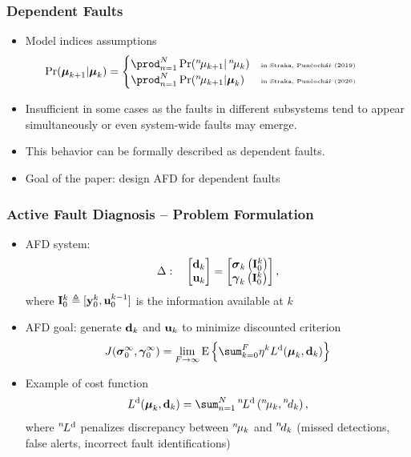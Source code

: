 \documentclass[usenames,dvipsnames]{beamer}
\def\nth{\prescript{n\!}{}}
\begin{document}
\begin{frame}
  \frametitle{Dependent Faults}
  \begin{itemize}
    \item Model indices assumptions
      \begin{align*}
      \hspace*{-3em}
        \Pr(\bfmu_{k+1}|\bfmu_{k})=
        \begin{cases}
        \prod_{n=1}^N\Pr(\nth{\mu}_{k+1}|\nth{\mu}_{k}) & \text{\tiny in~Straka, Pun\v{c}och\'{a}\v{r} (2019)}\\
          \prod_{n=1}^N\Pr(\nth{\mu}_{k+1}|\bfmu_{k}) & \text{\tiny in~Straka, Pun\v{c}och\'{a}\v{r} (2020)}
        \end{cases}
      \end{align*}
    \item Insufficient in some cases as the faults in different subsystems tend to appear \alert{simultaneously} or even \alert{system-wide faults} may emerge.
    \item This behavior can be formally described as dependent faults.
    \item \alert{Goal of the paper: design AFD for dependent faults}
  \end{itemize}
\end{frame}
\begin{frame}
  \frametitle{Active Fault Diagnosis -- Problem Formulation}
  \begin{itemize}[<+->]
    \item AFD system:
      \begin{align*}
  \Delta:\quad
  \begin{bmatrix}
    \mathbf{d}_{k}\\
    \mathbf{u}_{k}
  \end{bmatrix} = 
  \begin{bmatrix}
    \boldsymbol{\sigma}_{k}\left( \mathbf{I}_0^k\right)\\
    \boldsymbol{\gamma}_{k}\left(\mathbf{I}_{0}^{k}\right)
  \end{bmatrix},
\end{align*}
where $\mathbf{I}_0^k\triangleq[\mathbf{y}_{0}^{k},\mathbf{u}_{0}^{k-1}]$ is the information available at $k$
    \item AFD goal: generate $\mathbf{d}_k$ and $\mathbf{u}_k$ to minimize discounted
      criterion
      \begin{align*} 
        J(\bfsigma_{0}^{\infty},\bfgamma_{0}^{\infty}) = \lim_{F\to\infty} \mean \left\{ \sum_{k=0}^{F} \eta^{k} L^{\mathrm{d}}(\bfmu_{k},\bfd_{k})\right\}
      \end{align*}
      \item Example of cost function
\begin{align*}
L^{\mathrm{d}}(\bfmu_{k},\bfd_{k}) = \sum_{n=1}^{N} \nth{L}^{\mathrm{d}} \left(\nth{\mu}_{k},\nth{d}_{k} \right),
\end{align*}
where $\nth{L}^{\mathrm{d}}$ penalizes discrepancy between $\nth{\mu}_{k}$ and $\nth{d}_{k}$ (missed detections, false alerts, incorrect fault identifications)
  \end{itemize}
\end{frame}
\end{document}
